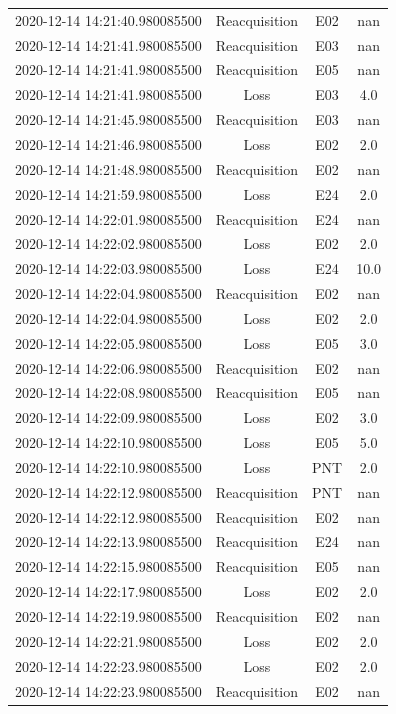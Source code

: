 \begin{enumerate}
\begin{longtabu}{cccc}
2020{-}12{-}14 14:21:40.980085500&Reacquisition&E02&nan\\%
2020{-}12{-}14 14:21:41.980085500&Reacquisition&E03&nan\\%
2020{-}12{-}14 14:21:41.980085500&Reacquisition&E05&nan\\%
2020{-}12{-}14 14:21:41.980085500&Loss&E03&4.0\\%
2020{-}12{-}14 14:21:45.980085500&Reacquisition&E03&nan\\%
2020{-}12{-}14 14:21:46.980085500&Loss&E02&2.0\\%
2020{-}12{-}14 14:21:48.980085500&Reacquisition&E02&nan\\%
2020{-}12{-}14 14:21:59.980085500&Loss&E24&2.0\\%
2020{-}12{-}14 14:22:01.980085500&Reacquisition&E24&nan\\%
2020{-}12{-}14 14:22:02.980085500&Loss&E02&2.0\\%
2020{-}12{-}14 14:22:03.980085500&Loss&E24&10.0\\%
2020{-}12{-}14 14:22:04.980085500&Reacquisition&E02&nan\\%
2020{-}12{-}14 14:22:04.980085500&Loss&E02&2.0\\%
2020{-}12{-}14 14:22:05.980085500&Loss&E05&3.0\\%
2020{-}12{-}14 14:22:06.980085500&Reacquisition&E02&nan\\%
2020{-}12{-}14 14:22:08.980085500&Reacquisition&E05&nan\\%
2020{-}12{-}14 14:22:09.980085500&Loss&E02&3.0\\%
2020{-}12{-}14 14:22:10.980085500&Loss&E05&5.0\\%
2020{-}12{-}14 14:22:10.980085500&Loss&PNT&2.0\\%
2020{-}12{-}14 14:22:12.980085500&Reacquisition&PNT&nan\\%
2020{-}12{-}14 14:22:12.980085500&Reacquisition&E02&nan\\%
2020{-}12{-}14 14:22:13.980085500&Reacquisition&E24&nan\\%
2020{-}12{-}14 14:22:15.980085500&Reacquisition&E05&nan\\%
2020{-}12{-}14 14:22:17.980085500&Loss&E02&2.0\\%
2020{-}12{-}14 14:22:19.980085500&Reacquisition&E02&nan\\%
2020{-}12{-}14 14:22:21.980085500&Loss&E02&2.0\\%
2020{-}12{-}14 14:22:23.980085500&Loss&E02&2.0\\%
2020{-}12{-}14 14:22:23.980085500&Reacquisition&E02&nan\\%

\end{longtabu}
\end{enumerate}
